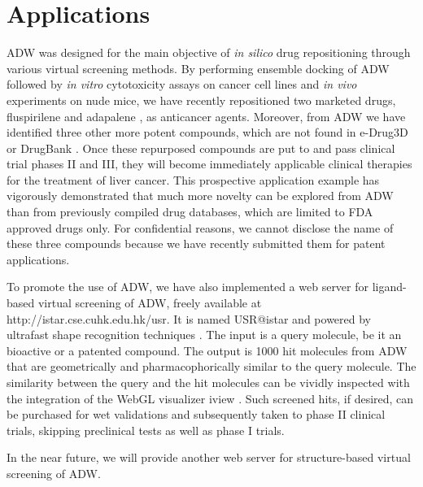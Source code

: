 \documentclass{bioinfo}
\begin{document}
\section{Applications}

ADW was designed for the main objective of \textit{in silico} drug repositioning through various virtual screening methods. By performing ensemble docking of ADW followed by \textit{in vitro} cytotoxicity assays on cancer cell lines and \textit{in vivo} experiments on nude mice, we have recently repositioned two marketed drugs, fluspirilene \citep{1667} and adapalene \citep{1681}, as anticancer agents. Moreover, from ADW we have identified three other more potent compounds, which are not found in e-Drug3D \citep{1125} or DrugBank \citep{1594}. Once these repurposed compounds are put to and pass clinical trial phases II and III, they will become immediately applicable clinical therapies for the treatment of liver cancer. This prospective application example has vigorously demonstrated that much more novelty can be explored from ADW than from previously compiled drug databases, which are limited to FDA approved drugs only. For confidential reasons, we cannot disclose the name of these three compounds because we have recently submitted them for patent applications.

To promote the use of ADW, we have also implemented a web server for ligand-based virtual screening of ADW, freely available at http://istar.cse.cuhk.edu.hk/usr. It is named USR@istar and powered by ultrafast shape recognition techniques \citep{1379,1331}. The input is a query molecule, be it an bioactive or a patented compound. The output is 1000 hit molecules from ADW that are geometrically and pharmacophorically similar to the query molecule. The similarity between the query and the hit molecules can be vividly inspected with the integration of the WebGL visualizer iview \citep{1366}. Such screened hits, if desired, can be purchased for wet validations and subsequently taken to phase II clinical trials, skipping preclinical tests as well as phase I trials.



In the near future, we will provide another web server for structure-based virtual screening of ADW.
\end{document}
